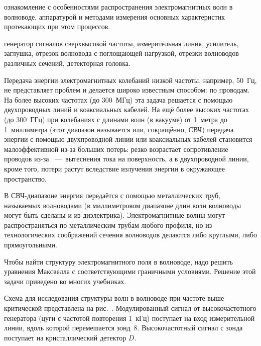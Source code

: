 
\begin{lab:aim} ознакомление с особенностями распространения
    электромагнитных волн в волноводе, аппаратурой и методами измерения основных
    характеристик протекающих при этом процессов. 
\end{lab:aim}

\begin{lab:equipment} генератор сигналов сверхвысокой частоты, измерительная
    линия, усилитель, заглушка, отрезок волновода с поглощающей нагрузкой, отрезки
    волноводов различных сечений, детекторная головка. 
\end{lab:equipment}

Передача энергии электромагнитных колебаний низкой частоты, например, 50~Гц, не
представляет проблем и делается широко известным способом: по проводам. На более
высоких частотах (до 300~МГц) эта задача решается с помощью двухпроводных линий
и коаксиальных кабелей. На ещё более высоких частотах (до 300~ГГц) при
колебаниях с длинами волн (в вакууме) от 1~метра до 1~миллиметра (этот диапазон
называется  или, сокращённо, СВЧ)
передача энергии с помощью двухпроводной линии или коаксиальных кабелей
становится малоэффективной из-за больших потерь: резко возрастает сопротивление
проводов из-за ~---~вытеснения тока на поверхность, а в
двухпроводной линии, кроме того, потери растут вследствие излучения энергии в
окружающее пространство.

В СВЧ-диапазоне энергия передаётся с помощью металлических труб, называемых
волноводами (в миллиметровом диапазоне длин волн волноводы могут быть сделаны и
из диэлектрика). Электромагнитные волны могут распространяться по металлическим
трубам любого профиля, но из технологических соображений сечения волноводов
делаются либо круглыми, либо прямоугольными.

Чтобы найти структуру электромагнитного поля в волноводе, надо решить уравнения
Максвелла с соответствующими граничными условиями. Решение этой задачи приведено
во многих учебниках.




\experiment Схема для исследования структуры волн в волноводе при частоте выше
критической представлена на рис.~. Модулированный
сигнал от высокочастотного генератора (цуги с частотой повторения 1~кГц)
поступает на вход измерительной линии, вдоль которой перемешается зонд~8.
Высокочастотный сигнал с зонда поступает на кристаллический детектор $D$.

